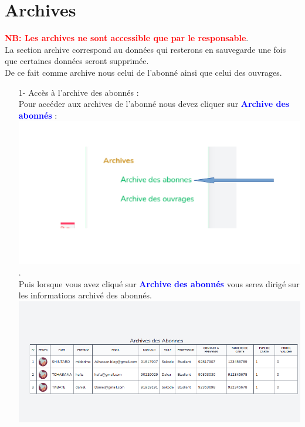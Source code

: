 \documentclass[12pt,a4paper]{article}
\begin{document}
\section{Archives}
\textbf{\textcolor{red}{NB: Les archives ne sont accessible que par le responsable}}.\\
La section archive correspond au données qui resterons en sauvegarde une fois que certaines données seront supprimée.\\
De ce fait comme archive nous celui de l'abonné ainsi que celui des ouvrages.\\
\begin{itemize}
\item[1-]Accès à l'archive des abonnés : \\
Pour accéder aux archives de l'abonné nous devez cliquer sur \textbf{\textcolor{blue}{Archive des abonnés}} : \\
\includegraphics[scale=0.5]{end/archiveAbonne.png}.\\
Puis lorsque vous avez cliqué sur \textbf{\textcolor{blue}{Archive des abonnés}} vous serez dirigé sur les informations archivé des abonnés.\\
\includegraphics[scale=0.5]{end/InfoAbonne.png}
\end{itemize}
\end{document}
